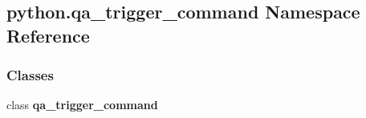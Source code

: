 \subsection{python.\+qa\+\_\+trigger\+\_\+command Namespace Reference}
\label{namespacepython_1_1qa__trigger__command}
\subsubsection*{Classes}
\begin{DoxyCompactItemize}
\item 
class {\bf qa\+\_\+trigger\+\_\+command}
\end{DoxyCompactItemize}
